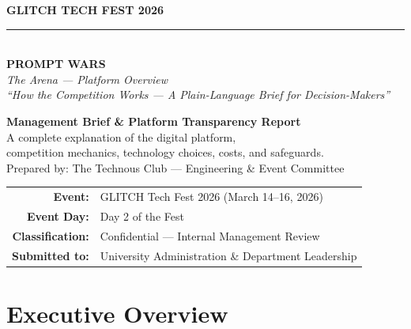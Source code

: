 \documentclass[11pt, a4paper]{article}
\begin{document}
\begin{titlepage}
    \centering
    \vspace*{1.6cm}
    {\LARGE\bfseries\textcolor{primaryblue}{GLITCH TECH FEST 2026}\\[0.35cm]}
    \textcolor{accentgold}{\rule{0.7\textwidth}{1.8pt}}\\[1cm]
    {\fontsize{30}{36}\selectfont\bfseries\textcolor{primaryblue}{PROMPT WARS}}\\[0.2cm]
    {\Large\textcolor{sectionblue}{\textit{The Arena --- Platform Overview}}}\\[0.7cm]
    {\normalsize\textcolor{darktext}{\textit{``How the Competition Works --- A Plain-Language Brief for Decision-Makers''}}}\\[1.8cm]

    \begin{tcolorbox}[
        colback=lightgray, colframe=primaryblue,
        boxrule=1pt, arc=5pt, width=0.82\textwidth, halign=center,
    ]
        {\large\textbf{Management Brief \& Platform Transparency Report}}\\[0.25cm]
        {\small A complete explanation of the digital platform,}\\
        {\small competition mechanics, technology choices, costs, and safeguards.}\\[0.15cm]
        {\small Prepared by: The Technous Club --- Engineering \& Event Committee}
    \end{tcolorbox}

    \vfill
    \begin{tabular}{r l}
        \textbf{Event:}          & GLITCH Tech Fest 2026 (March 14--16, 2026) \\
        \textbf{Event Day:}      & Day 2 of the Fest \\
        \textbf{Classification:} & Confidential --- Internal Management Review \\
        \textbf{Submitted to:}   & University Administration \& Department Leadership \\
    \end{tabular}
    \vspace{1.5cm}
\end{titlepage}

{\setlength{\parskip}{0pt}\small\tableofcontents}
\newpage

\section{Executive Overview}
\end{document}
